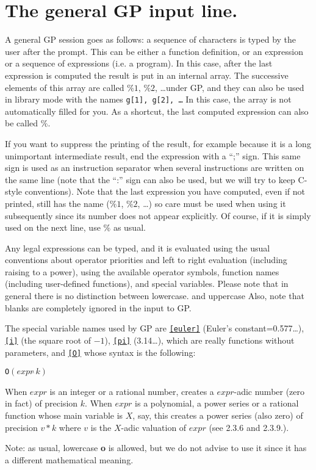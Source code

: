 \section{The general GP input line.}

A general GP session goes as follows: a sequence of characters is typed by the
user after the prompt. This can be either a function definition, or an
expression or a sequence of expressions (i.e. a program). In this case, after
the last expression is computed the result is
put in an internal array. The successive elements of this array are called
$\%1$, $\%2$, \dots under GP, and they can also be used in library mode with the names 
{\tt g[1], g[2], \dots} In this case, the array is not automatically filled for you.
As a shortcut, the last computed expression can also be called $\%$.

If you want to suppress the printing of the result, for example because it is
a long unimportant intermediate result, end the expression with a ``;'' sign.
This same sign is used as an instruction separator when several instructions
are written on the same line (note that the ``:'' sign can also be used, but
we will try to keep C-style conventions).
Note that the last expression you have computed, even if not printed,
still has the name ($\%1$, $\%2$, \dots) so care must be used when using it
subsequently since its number does not appear explicitly. Of course, if it
is simply used on the next line, use $\%$ as usual.

Any legal expressions can be typed, and it is evaluated using the usual
conventions about operator priorities and left to right evaluation
(including raising to a power), using the available operator
symbols, function names (including user-defined functions), and special
variables. Please note that in general there
is no distinction between lowercase. and uppercase
Also, note that blanks are completely ignored in the input to GP.

The special variable names used by GP are {\tt \ref{euler}} (Euler's
constant=0.577\dots), {\tt \ref{i}} (the square root of $-1$),
{\tt \ref{pi}} (3.14\dots), which are really functions without parameters, and {\tt \ref{O}} whose syntax is the following:

{\tt O}$(expr\hat{\ }k)$

When $expr$ is an integer or a
rational number, creates a $expr$-adic number (zero in fact) of precision $k$.
When $expr$ is a polynomial, a power series or a rational function whose main
variable is $X$, say, this creates
a power series (also zero) of precision $v*k$ where $v$ is the
$X$-adic valuation of $expr$ (see 2.3.6 and 2.3.9.).

Note: as usual, lowercase {\bf o} is allowed, but we do not
advise to use it since it has a different mathematical meaning.

\vfill\eject



